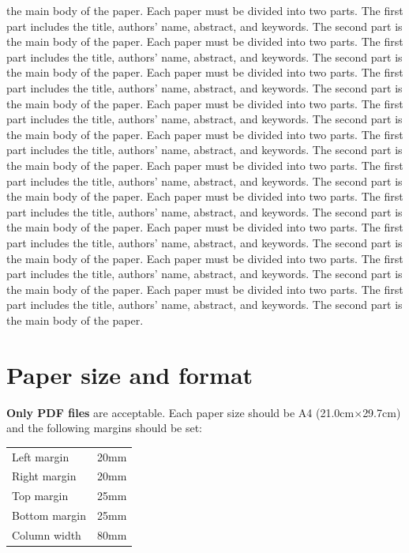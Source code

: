 \documentclass[fleqn,10pt,twocolumn]{ICCAS2018}
\begin{document}
the main body of the paper.
Each paper must be divided into two parts. The first part includes
the title, authors' name, abstract, and keywords. The second part is
the main body of the paper.
Each paper must be divided into two parts. The first part includes
the title, authors' name, abstract, and keywords. The second part is
the main body of the paper.
Each paper must be divided into two parts. The first part includes
the title, authors' name, abstract, and keywords. The second part is
the main body of the paper.
Each paper must be divided into two parts. The first part includes
the title, authors' name, abstract, and keywords. The second part is
the main body of the paper.
Each paper must be divided into two parts. The first part includes
the title, authors' name, abstract, and keywords. The second part is
the main body of the paper.
Each paper must be divided into two parts. The first part includes
the title, authors' name, abstract, and keywords. The second part is
the main body of the paper.
Each paper must be divided into two parts. The first part includes
the title, authors' name, abstract, and keywords. The second part is
the main body of the paper.
Each paper must be divided into two parts. The first part includes
the title, authors' name, abstract, and keywords. The second part is
the main body of the paper.
Each paper must be divided into two parts. The first part includes
the title, authors' name, abstract, and keywords. The second part is
the main body of the paper.
Each paper must be divided into two parts. The first part includes
the title, authors' name, abstract, and keywords. The second part is
the main body of the paper.


\section{Paper size and format}
\textbf{Only PDF files} are acceptable. Each paper size should be
A4 (21.0cm$\times$29.7cm) and the following margins should be set:

\begin{center}
\begin{tabular}{lc}
    Left margin  &  20mm \\
    Right margin &  20mm \\
    Top margin   &  25mm \\
    Bottom margin&  25mm \\
    Column width &  80mm \\
\end{tabular}
\end{center}
\end{document}
